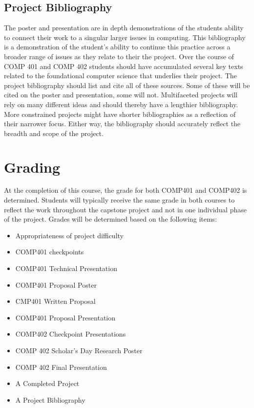 \documentclass[10pt]{article}
\begin{document}
\subsection{Project Bibliography}

The poster and presentation are in depth demonstrations of the students ability to connect their work to a singular larger issues in computing. This bibliography is a demonstration of the student's ability to continue this practice across a broader range of issues as they relate to their the project. Over the course of COMP 401 and COMP 402 students should have accumulated several key texts related to the foundational computer science that underlies their project. The project bibliography should list and cite all of these sources. Some of these will be cited on the poster and presentation, some will not.  Multifaceted projects will rely on many different ideas and should thereby have a lengthier bibliography. More constrained projects might have shorter bibliographies as a reflection of their narrower focus. Either way, the bibliography should accurately reflect the breadth and scope of the project. 

\section{Grading}

At the completion of this course, the grade for both COMP401 and COMP402 is determined. Students will typically receive the same grade in both courses to reflect the work throughout the capstone project and not in one individual phase of the project. Grades will be determined based on the following items:
\begin{itemize}
\item Appropriateness of project difficulty 
\item COMP401 checkpoints
\item COMP401 Technical Presentation
\item COMP401 Proposal Poster
\item CMP401 Written Proposal
\item COMP401 Proposal Presentation
\item COMP402 Checkpoint Presentations 
\item COMP 402 Scholar's Day Research Poster
\item COMP 402 Final Presentation 
\item A Completed Project 
\item A Project Bibliography
\end{itemize}
\end{document}
